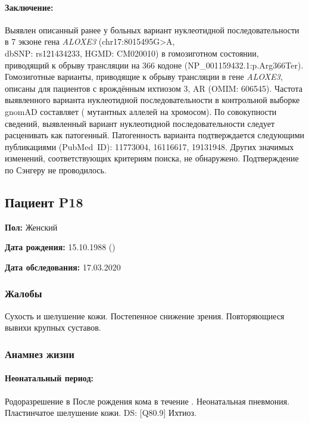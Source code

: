 \documentclass[a4paper,14pt]{extarticle}
\newcommand{\months}{мес.}
\newcommand{\genename}[1]{\textit{#1}}
\newcommand{\DS}[2]{[#2] #1}
\begin{document}
\paragraph{Заключение:} Выявлен описанный ранее у больных вариант нуклеотидной последовательности в 7 экзоне гена \genename{ALOXE3} (chr17:8015495G>A,\\dbSNP: rs121434233, HGMD: CM020010) в гомозиготном состоянии, приводящий к обрыву трансляции на 366 кодоне (NP\_001159432.1:p.Arg366Ter).
Гомозиготные варианты, приводящие к обрыву трансляции в гене \genename{ALOXE3}, описаны для пациентов с врождённым ихтиозом 3, AR (OMIM: 606545).
Частота выявленного варианта нуклеотидной последовательности в контрольной выборке gnomAD составляет  ( мутантных аллелей на  хромосом).
По совокупности сведений, выявленный вариант нуклеотидной последовательности следует расценивать как патогенный.
Патогенность варианта подтверждается следующими публикациями (PubMed~ID): 11773004, 16116617, 19131948.
Других значимых изменений, соответствующих критериям поиска, не обнаружено.
Подтверждение по Сэнгеру не проводилось.

\newpage
\subsection*{Пациент P18}

\textbf{Пол:} Женский

\textbf{Дата рождения:} 15.10.1988 ()

\textbf{Дата обследования:} 17.03.2020

\subsubsection*{Жалобы}

Сухость и шелушение кожи. Постепенное снижение зрения. Повторяющиеся вывихи крупных суставов.

\subsubsection*{Анамнез жизни}

\paragraph{Неонатальный период:} Родоразрешение в \numprint[\months]{7} После рождения кома в течение . Неонатальная пневмония. Пластинчатое шелушение кожи. DS: \DS{Ихтиоз}{Q80.9}.
\end{document}
